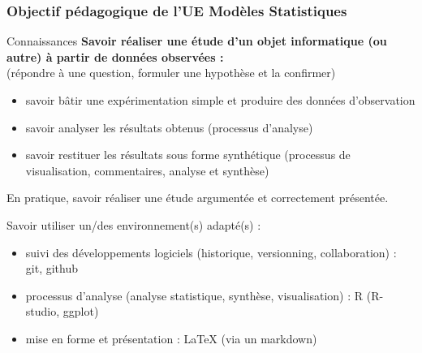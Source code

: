 \documentclass[xcolor=x11names,compress,8pt]{beamer}
\renewcommand{\(}{\begin{columns}}
\renewcommand{\)}{\end{columns}}
\newcommand{\<}[1]{\begin{column}{#1}}
\renewcommand{\>}{\end{column}}
\begin{document}
\begin{frame}
\frametitle{Objectif pédagogique de l'UE Modèles Statistiques}
\begin{alertblock}{Connaissances}
\textbf{Savoir réaliser une étude d'un objet informatique (ou autre) à partir de données observées :}\\
(répondre à une question, formuler une hypothèse et la confirmer)
\begin{itemize}
\item savoir bâtir une expérimentation simple et produire des données
  d'observation
\item savoir analyser les résultats obtenus (processus d'analyse)
\item savoir restituer les résultats sous forme synthétique (processus de
  visualisation, commentaires, analyse et synthèse)
\end{itemize}
En pratique, savoir réaliser une étude argumentée et correctement
présentée.
\end{alertblock}

\begin{alertblock}{Savoir utiliser un/des environnement(s) adapté(s) :}
\begin{itemize}
\item suivi des développements logiciels (historique, versionning, collaboration) : git, github
\item processus d'analyse (analyse statistique, synthèse, visualisation) : R (R-studio, ggplot)
\item mise en forme et présentation : LaTeX (via un markdown)
\end{itemize}
\end{alertblock}
\end{frame}
\end{document}
